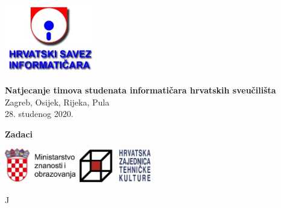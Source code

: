 \documentclass[a4paper]{article}
\begin{document}
\thispagestyle{empty}
\begin{center}
  \includegraphics[height=3cm]{pic/hsin.jpg}
\end{center}
\vspace{1cm}
\begin{center}
  {\Large\textbf{\textsf{Natjecanje timova studenata informatičara hrvatskih sveučilišta}}} \\
  \vspace{.5cm}
  {\large{\textsf{Zagreb, Osijek, Rijeka, Pula}}} \\
  \vspace{.3cm}
  \textsf{28. studenog 2020.}
\end{center}
\vspace{2cm}
\begin{center}
  {\large \textbf{Zadaci}}

  \begin{minipage}{.5\textwidth}
    \renewcommand\contentsname{}
    \tableofcontents
  \end{minipage}
\end{center}
\vspace{5cm}
\begin{center}
  \includegraphics[height=1.5cm]{pic/mzo.jpg}
  \hspace{3cm}
  \includegraphics[height=1.5cm]{pic/hztk.png}
\end{center}
\vspace{\fill}
\clearpage
\setcounter{page}{1}
{J}
\end{document}

